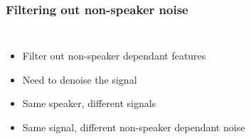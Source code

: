 \documentclass[11pt,english]{beamer}
\begin{document}
\begin{frame}
  \frametitle{Filtering out non-speaker noise} 
  \begin{columns}
    \begin{itemize}
    \item Filter out non-speaker dependant features
    \item<2-3> Need to denoise the signal
    \item<3> Same speaker, different signals     
    \item<3> Same signal, different non-speaker dependant noise
    \end{itemize}
  \end{columns}
\end{frame}
\end{document}
